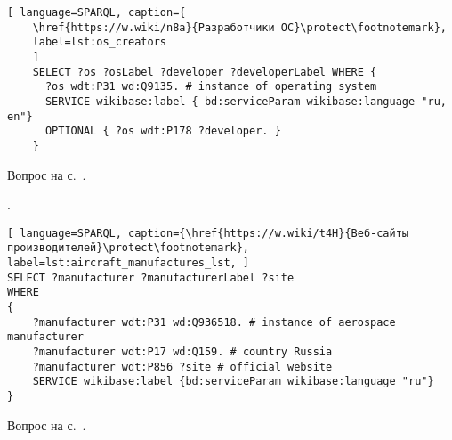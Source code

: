 \begin{task}
	\label{answer:what_system_created}
	
	\begin{lstlisting}[ language=SPARQL, caption={
	\href{https://w.wiki/n8a}{Разработчики ОС}\protect\footnotemark},
	label=lst:os_creators
	]
	SELECT ?os ?osLabel ?developer ?developerLabel WHERE {
	  ?os wdt:P31 wd:Q9135. # instance of operating system
	  SERVICE wikibase:label { bd:serviceParam wikibase:language "ru, en"}
	  OPTIONAL { ?os wdt:P178 ?developer. }
	}
	\end{lstlisting}
	
	\small{Вопрос на с.~\pageref{lst:inception_time_of_operating_systems}.}
\end{task}


\begin{task}
    \label{answer:aircraft_manufacturers}
    . 
    
	\begin{lstlisting}[ language=SPARQL, caption={\href{https://w.wiki/t4H}{Веб-сайты производителей}\protect\footnotemark}, label=lst:aircraft_manufactures_lst, ]
SELECT ?manufacturer ?manufacturerLabel ?site
WHERE
{
    ?manufacturer wdt:P31 wd:Q936518. # instance of aerospace manufacturer
  	?manufacturer wdt:P17 wd:Q159. # country Russia
  	?manufacturer wdt:P856 ?site # official website
    SERVICE wikibase:label {bd:serviceParam wikibase:language "ru"}
}
\end{lstlisting}
    
    \small{Вопрос на с.~\pageref{lst:lang2}.}
\end{task}

